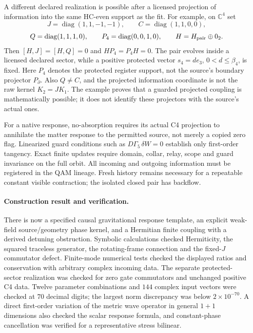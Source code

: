 \documentclass[11pt,a4paper]{article}
\begin{document}
A different declared realization is possible after a licensed
projection of information into the same HC-even support as the fit.
For example, on $\mathbb C^4$ set
\[
 J=\operatorname{diag}(1,1,-1,-1),\qquad
 C=\operatorname{diag}(1,1,0,0),
\]
\[
 Q=\operatorname{diag}(1,1,1,0),\qquad
 P_4=\operatorname{diag}(0,0,1,0),\qquad
 H=H_{\rm pair}\oplus0_2.
\]
Then $[H,J]=[H,Q]=0$ and $HP_4=P_4H=0$. The pair evolves inside
a licensed declared sector, while a positive protected vector
$s_4=d e_3$, $0<d\le\beta_4$, is fixed. Here $P_4$ denotes the protected
register support, not the source's boundary projector $P_\partial$.
Also $Q\ne C$, and the projected
information coordinate is not the raw kernel $K_2=JK_1$.
The example proves that a guarded projected coupling is
mathematically possible; it does not identify these projectors
with the source's actual ones.

For a native response, no-absorption requires its actual C4
projection to annihilate the matter response to the permitted
source, not merely a copied zero flag. Linearized guard conditions
such as $D\Gamma_5\,\delta W=0$ establish only first-order
tangency. Exact finite updates require domain, collar, relay,
scope and guard invariance on the full orbit. All incoming and
outgoing information must be registered in the QAM lineage.
Fresh history remains necessary for a repeatable constant
visible contraction; the isolated closed pair has backflow.

\paragraph{Construction result and verification.}
There is now a specified causal gravitational response template,
an explicit weak-field source/geometry phase kernel, and a
Hermitian finite coupling with a derived detuning obstruction.
Symbolic calculations checked Hermiticity, the squared traceless
generator, the rotating-frame connection and the fixed-$J$
commutator defect. Finite-mode numerical tests checked the
displayed ratios and conservation with arbitrary complex
incoming data. The separate protected-sector realization was
checked for zero gate commutators and unchanged positive C4 data.
Twelve parameter combinations and $144$ complex input vectors
were checked at $70$ decimal digits; the largest norm discrepancy
was below $2\times10^{-70}$. A direct first-order variation of the
metric wave operator in general $1+1$ dimensions also checked the
scalar response formula, and constant-phase cancellation was
verified for a representative stress bilinear.
\end{document}
